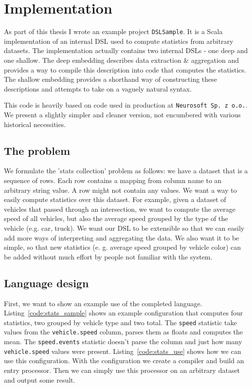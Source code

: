\chapter{Implementation}

As part of this thesis I wrote an example project \texttt{DSLSample}. It is a Scala implementation of an internal DSL used to compute statistics from arbitrary datasets. The implementation actually contains two internal DSLs - one deep and one shallow. The deep embedding describes data extraction & aggregation and provides a way to compile this description into code that computes the statistics. The shallow embedding provides a shorthand way of constructing these descriptions and attempts to take on a vaguely natural syntax.

This code is heavily based on code used in production at \texttt{Neurosoft~Sp.~z~o.o.}. We present a slightly simpler and cleaner version, not encumbered with various historical necessities.

\section{The problem}

We formulate the 'stats collection' problem as follows: we have a dataset that is a sequence of rows. Each row contains a mapping from column name to an arbitrary string value. A row might not contain any values. We want a way to easily compute statistics over this dataset. For example, given a dataset of vehicles that passed through an intersection, we want to compute the average speed of all vehicles, but also the average speed grouped by the type of the vehicle (e.g. car, truck). We want our DSL to be extensible so that we can easily add more ways of interpreting and aggregating the data. We also want it to be simple, so that new statistics (e. g. average speed grouped by vehicle color) can be added without much effort by people not familiar with the system.

\section{Language design}

First, we want to show an example use of the completed language. Listing~\ref{code:stats_sample} shows an example configuration that computes four statistics, two grouped by vehicle type and two total. The \texttt{speed} statistic take values from the \texttt{vehicle.speed} column, parses them as floats and computes the mean. The \texttt{speed.events} statistic doesn't parse the column and just how many \texttt{vehicle.speed} values were present. Listing~\ref{code:stats_use} shows how we can use this configuration. With the configuration we create a compiler and build an entry processor. Then we can simply use this processor on an arbitrary dataset and output some result.

